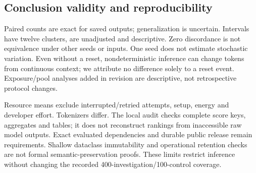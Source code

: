 \subsection{Conclusion validity and reproducibility}
Paired counts are exact for saved outputs; generalization is uncertain. Intervals have twelve clusters, are unadjusted and descriptive. Zero discordance is not equivalence under other seeds or inputs. One seed does not estimate stochastic variation. Even without a reset, nondeterministic inference can change tokens from continuous context; we attribute no difference solely to a reset event. Exposure/pool analyses added in revision are descriptive, not retrospective protocol changes.

Resource means exclude interrupted/retried attempts, setup, energy and developer effort. Tokenizers differ. The local audit checks complete score keys, aggregates and tables; it does not reconstruct rankings from inaccessible raw model outputs. Exact evaluated dependencies and durable public release remain requirements. Shallow dataclass immutability and operational retention checks are not formal semantic-preservation proofs. These limits restrict inference without changing the recorded 400-investigation/100-control coverage.

